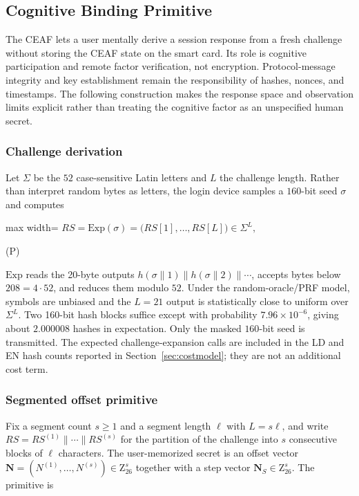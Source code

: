 \documentclass[cmc,article,submit,moreauthors,pdftex]{Definitions/tsp}
\renewcommand{\mathsf}[1]{\mathrm{#1}}
\renewcommand{\mathbb}[1]{\mathrm{#1}}
\newcommand{\cc}{\mathbin{\|}}
\newcounter{protoeq}
\newenvironment{ceq}{%
  \refstepcounter{protoeq}%
  \par\vspace{-3pt}\setlength{\topsep}{0pt}\setlength{\partopsep}{0pt}\begin{center}%
}{%
  \hspace{0.45em}\textup{(P\theprotoeq)}%
  \end{center}\vspace{-3pt}%
}
\begin{document}
\subsection{Cognitive Binding Primitive}\label{sec:ceaf}

The CEAF lets a user mentally derive a session response from a fresh challenge without storing the CEAF state on the smart card. Its role is cognitive participation and remote factor verification, not encryption. Protocol-message integrity and key establishment remain the responsibility of hashes, nonces, and timestamps. The following construction makes the response space and observation limits explicit rather than treating the cognitive factor as an unspecified human secret.

\subsubsection{Challenge derivation}\label{sec:challenge}

Let $\Sigma$ be the $52$ case-sensitive Latin letters and $L$ the challenge length. Rather than interpret random bytes as letters, the login device samples a $160$-bit seed $\sigma$ and computes

\begin{ceq}
\begin{adjustbox}{max width=\columnwidth}
$\displaystyle RS = \mathsf{Exp}(\sigma) = \bigl(RS[1],\dots,RS[L]\bigr)\in\Sigma^{L},$
\end{adjustbox}
\end{ceq}

$\mathsf{Exp}$ reads the 20-byte outputs $h(\sigma\cc1)\cc h(\sigma\cc2)\cc\cdots$, accepts bytes below $208=4\cdot52$, and reduces them modulo $52$. Under the random-oracle/PRF model, symbols are unbiased and the $L=21$ output is statistically close to uniform over $\Sigma^L$. Two 160-bit hash blocks suffice except with probability $7.96\times10^{-6}$, giving about $2.000008$ hashes in expectation. Only the masked $160$-bit seed is transmitted. The expected challenge-expansion calls are included in the LD and EN hash counts reported in Section~\ref{sec:costmodel}; they are not an additional cost term.

\subsubsection{Segmented offset primitive}

Fix a segment count $s\ge 1$ and a segment length $\ell$ with $L=s\ell$, and write $RS=RS^{(1)}\cc\cdots\cc RS^{(s)}$ for the partition of the challenge into $s$ consecutive blocks of $\ell$ characters. The user-memorized secret is an offset vector $\mathbf{N}=(N^{(1)},\dots,N^{(s)})\in\mathbb{Z}_{26}^{s}$ together with a step vector $\mathbf{N}_S\in\mathbb{Z}_{26}^{s}$. The primitive is
\end{document}
